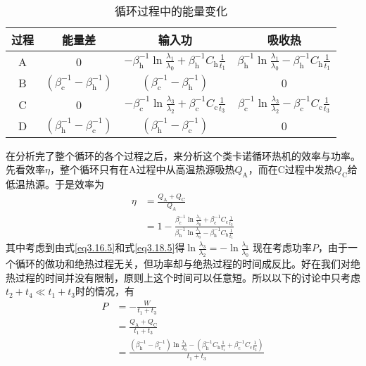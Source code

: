 \begin{table}[!htbp]
    \caption{循环过程中的能量变化}
    \centering
    \begin{tabular}{c|c|c|c}
    \hline
    过程  & 能量差  & 输入功     & 吸收热 \\ 
    \hline
    A    & 0       & $-\beta_{\mathrm{h}}^{-1} \ln{\frac{\lambda_1}{\lambda_0}} + \beta_{\mathrm{h}}^{-1} C_{\mathrm{h}} \frac{1}{t_1}$                    &$\beta_{\mathrm{h}}^{-1} \ln{\frac{\lambda_1}{\lambda_0}} - \beta_{\mathrm{h}}^{-1} C_{\mathrm{h}} \frac{1}{t_1}$     \\ 
    \hline
    B    & $(\beta_{\mathrm{c}}^{-1} - \beta_{\mathrm{h}}^{-1})$ & $(\beta_{\mathrm{c}}^{-1} - \beta_{\mathrm{h}}^{-1})$ & 0   \\ 
    \hline
    C    & 0       & $-\beta_{\mathrm{c}}^{-1} \ln{\frac{\lambda_3}{\lambda_2}} + \beta_{\mathrm{c}}^{-1} C_{\mathrm{c}} \frac{1}{t_3}$                    &$\beta_{\mathrm{c}}^{-1} \ln{\frac{\lambda_3}{\lambda_2}} - \beta_{\mathrm{c}}^{-1} C_{\mathrm{c}} \frac{1}{t_3}$     \\ 
    \hline
    D    & $(\beta_{\mathrm{h}}^{-1} - \beta_{\mathrm{c}}^{-1})$ & $(\beta_{\mathrm{h}}^{-1} - \beta_{\mathrm{c}}^{-1})$                         & 0   \\ 
    \hline
    \end{tabular}
    \label{t3.2}
\end{table}

在分析完了整个循环的各个过程之后，来分析这个类卡诺循环热机的效率与功率。先看效率$\eta$，整个循环只有在A过程中从高温热源吸热$Q_{\mathrm{A}}$，而在C过程中发热$Q_{\mathrm{C}}$给低温热源。于是效率为
\begin{equation}
    \begin{split}
        \eta &= \frac{Q_{\mathrm{A}} + Q_{\mathrm{C}}}{Q_{\mathrm{A}}}\\ 
        &=1- \frac{\beta_{\mathrm{c}}^{-1} \ln{\frac{\lambda_1}{\lambda_0}} + \beta_{\mathrm{c}}^{-1} C_{\mathrm{c}} \frac{1}{t_3}}{\beta_{\mathrm{h}}^{-1} \ln{\frac{\lambda_1}{\lambda_0}} - \beta_{\mathrm{h}}^{-1} C_{\mathrm{h}} \frac{1}{t_1}}
    \end{split}
    \label{3.20}
\end{equation}
其中考虑到由式\eqref{eq3.16.5}和式\eqref{eq3.18.5}得$\ln{\frac{\lambda_3}{\lambda_2}}=-\ln{\frac{\lambda_1}{\lambda_0}}$
现在考虑功率$P$，由于一个循环的做功和绝热过程无关，但功率却与绝热过程的时间成反比。好在我们对绝热过程的时间并没有限制，原则上这个时间可以任意短。所以以下的讨论中只考虑$t_2 + t_4 \ll t_1 + t_3$时的情况，有
\begin{equation}
    \begin{split}
        P&=-\frac{W}{t_1+t_3}\\
        &=\frac{Q_{\mathrm{A}} + Q_{\mathrm{C}}}{t_1+t_3}\\
        &=\frac{\left(\beta_{\mathrm{h}}^{-1}-\beta_{\mathrm{c}}^{-1}\right) \ln{\frac{\lambda_1}{\lambda_0}} - \left(\beta_{\mathrm{h}}^{-1} C_{\mathrm{h}} \frac{1}{t_1} + \beta_{\mathrm{c}}^{-1} C_{\mathrm{c}} \frac{1}{t_3}\right)}{t_1+t_3}
    \end{split}
    \label{eq3.35}
\end{equation}


